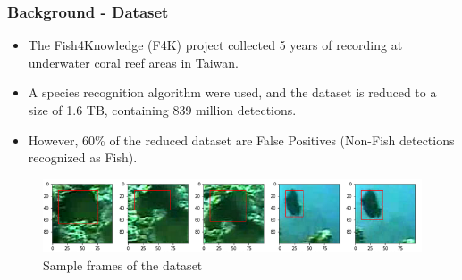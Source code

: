 \documentclass{beamer}[fullspacing]
\begin{document}
\begin{frame}
\frametitle{Background - Dataset}

\begin{itemize}
\item
The Fish4Knowledge (F4K) project\cite{F4K} collected 5 years of recording at underwater coral reef areas in Taiwan.
\item
A species recognition algorithm were used, and the dataset is reduced to a size of 1.6 TB, containing 839 million detections.
\item
However, 60\% of the reduced dataset are False Positives (Non-Fish detections recognized as Fish).
\end{itemize}

\begin{figure}
\includegraphics[scale=0.4]{image/sample.png}
\caption{Sample frames of the dataset}
\end{figure}

\end{frame}
\end{document}
